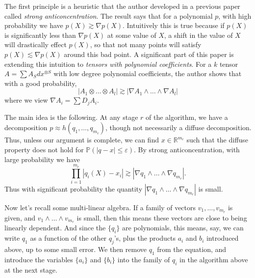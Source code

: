 \documentclass{article}
\theoremstyle{plain}
\theoremstyle{definition}
\begin{document}
The first principle is a heuristic that the author developed in a previous paper called \emph{strong anticoncentration}. The result says that for a polynomial $p$, with high probability we have $p(X) \gtrsim \nabla p(X)$. Intuitively this is true because if $p(X)$ is significantly less than $\nabla p(X)$ at some value of $X$, a shift in the value of $X$ will drastically effect $p(X)$, so that not many points will satisfy $p(X) \lesssim \nabla p(X)$ around this bad point.  A significant part of this paper is extending this intuition to \emph{tensors with polynomial coefficients}. For a $k$ tensor $A = \sum A_S dx^{\otimes S}$ with low degree polynomial coefficients, the author shows that with a good probability,
%
\[ |A_1 \otimes \dots \otimes A_l| \gtrsim | \nabla A_1 \wedge \dots \wedge \nabla A_l | \]
%
where we view $\nabla A_i = \sum D_j A_i$.

The main idea is the following. At any stage $r$ of the algorithm, we have a decomposition $p \approx h(q_1,\dots,q_{m_r})$, though not necessarily a diffuse decomposition. Thus, unless our argument is complete, we can find $x \in \mathbb{R}^{m_r}$ such that the diffuse property does not hold for $\mathbb{P}(|q - x| \leq \varepsilon)$. By strong anticoncentration, with large probability we have
%
\[ \prod_{i = 1}^{m_r} |q_i(X) - x_i| \gtrsim |\nabla q_1 \wedge \dots \wedge \nabla q_{m_r}|. \]
%
Thus with significant probability the quantity $|\nabla q_1 \wedge \dots \wedge \nabla q_{m_r}|$ is small.

Now let's recall some multi-linear algebra. If a family of vectors $v_1,\dots,v_{m_r}$ is given, and $v_1 \wedge \dots \wedge v_{m_r}$ is small, then this means these vectors are close to being linearly dependent. And since the $\{ q_i \}$ are polynomials, this means, say, we can write $q_1$ as a function of the other $q_j$'s, plus the products $a_i$ and $b_i$ introduced above, up to some small error. We then remove $q_1$ from the equation, and introduce the variables $\{ a_i \}$ and $\{ b_i \}$ into the family of $q_i$ in the algorithm above at the next stage.
\end{document}
